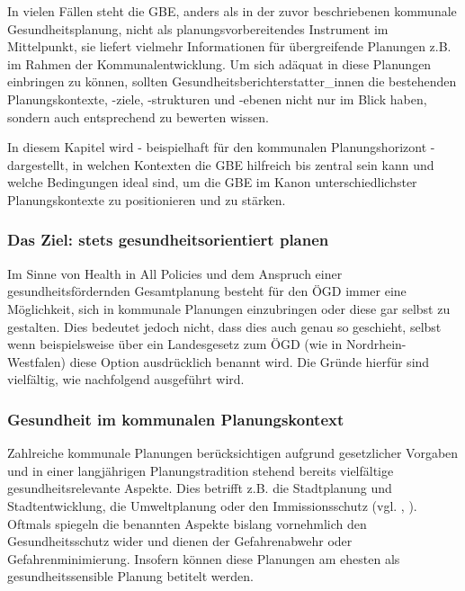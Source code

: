\documentclass{article}
\begin{document}
In vielen Fällen steht die GBE, anders als in der zuvor beschriebenen kommunale Gesundheitsplanung, nicht als planungsvorbereitendes Instrument im Mittelpunkt, sie liefert vielmehr Informationen für übergreifende Planungen z.B. im Rahmen der Kommunalentwicklung. Um sich adäquat in diese Planungen einbringen zu können, sollten Gesundheitsberichterstatter\_innen die bestehenden Planungskontexte, -ziele, -strukturen und -ebenen nicht nur im Blick haben, sondern auch entsprechend zu bewerten wissen. 


In diesem Kapitel wird - beispielhaft für den kommunalen Planungshorizont - dargestellt, in welchen Kontexten die GBE hilfreich bis zentral sein kann und welche Bedingungen ideal sind, um die GBE im Kanon unterschiedlichster Planungskontexte zu positionieren und zu stärken.  


\subsubsection{Das Ziel: stets gesundheitsorientiert planen}\label{H7577170}



Im Sinne von Health in All Policies und dem Anspruch einer gesundheitsfördernden Gesamtplanung besteht für den ÖGD immer eine Möglichkeit, sich in kommunale Planungen einzubringen oder diese gar selbst zu gestalten. Dies bedeutet jedoch nicht, dass dies auch genau so geschieht, selbst wenn beispielsweise über ein Landesgesetz zum ÖGD (wie in Nordrhein-Westfalen) diese Option ausdrücklich benannt wird. Die Gründe hierfür sind vielfältig, wie nachfolgend ausgeführt wird. 


\subsubsection{Gesundheit im kommunalen Planungskontext}\label{H7957666}



Zahlreiche kommunale Planungen berücksichtigen aufgrund gesetzlicher Vorgaben und in einer langjährigen Planungstradition stehend bereits vielfältige gesundheitsrelevante Aspekte. Dies betrifft z.B. die Stadtplanung und Stadtentwicklung, die Umweltplanung oder den Immissionsschutz (vgl. \autocite{RodensteinMarianne2012}, \autocite{LandeszentrumGesundheitNordrhein-Westfalen(LZG.NRW)2019} ). Oftmals spiegeln die benannten Aspekte bislang vornehmlich den Gesundheitsschutz wider und dienen der Gefahrenabwehr oder Gefahrenminimierung. Insofern können diese Planungen am ehesten als gesundheitssensible Planung betitelt werden.  
\end{document}
